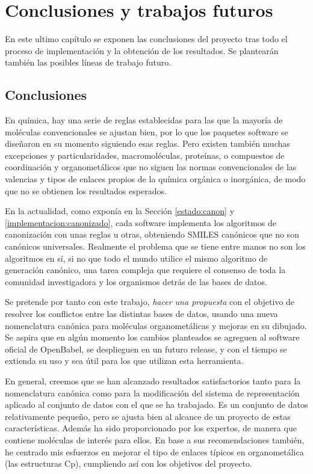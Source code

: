 \chapter{Conclusiones y trabajos futuros} \label{cap:conclusiones}

En este ultimo capítulo se exponen las conclusiones del proyecto tras todo el proceso de implementación y la obtención de los resultados. Se plantearán también las posibles líneas de trabajo futuro.

\section{Conclusiones}

En química, hay una serie de reglas establecidas para las que la mayoría de moléculas convencionales se ajustan bien, por lo que los paquetes software se diseñaron en su momento siguiendo esas reglas. Pero existen también muchas excepciones y particularidades, macromoléculas, proteínas, o compuestos de coordinación y organometálicos que no siguen las normas convencionales de las valencias y tipos de enlaces propios de la química orgánica o inorgánica, de modo que no se obtienen los resultados esperados.

En la actualidad, como exponía en la Sección \ref{estado:canon} y \ref{implementacion:canonizado}, cada software implementa los algoritmos de canonización con unas reglas u otras, obteniendo SMILES canónicos que no son canónicos universales. Realmente el problema que se tiene entre manos no son los algoritmos en sí, si no que todo el mundo utilice el mismo algoritmo de generación canónico, una tarea compleja que requiere el consenso de toda la comunidad investigadora y los organismos detrás de las bases de datos.

Se pretende por tanto con este trabajo, \textit{hacer una propuesta} con el objetivo de resolver los conflictos entre las distintas bases de datos, usando una nueva nomenclatura canónica para moléculas organometálicas y mejoras en su dibujado.
Se aspira que en algún momento los cambios planteados se agreguen al software oficial de OpenBabel, se desplieguen en un futuro release, y con el tiempo se extienda su uso y sea útil para los que utilizan esta herramienta.


En general, creemos que se han alcanzado resultados satisfactorios tanto para la nomenclatura canónica como para la modificación del sistema de representación aplicado al conjunto de datos con el que se ha trabajado. Es un conjunto de datos relativamente pequeño, pero se ajusta bien al alcance de un proyecto de estas características. Además ha sido proporcionado por los expertos, de manera que contiene moléculas de interés para ellos. En base a sus recomendaciones también, he centrado mis esfuerzos en mejorar el tipo de enlaces típicos en organometálica (las estructuras Cp), cumpliendo así con los objetivos del proyecto.



